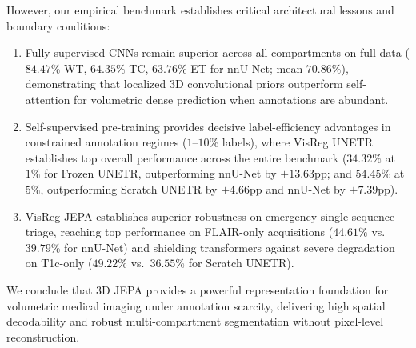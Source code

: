 \documentclass{article}
\begin{document}
However, our empirical benchmark establishes critical architectural lessons and boundary conditions:
\begin{enumerate}
    \item Fully supervised CNNs remain superior across all compartments on full data ($84.47\%$ WT, $64.35\%$ TC, $63.76\%$ ET for nnU-Net; mean $70.86\%$), demonstrating that localized 3D convolutional priors outperform self-attention for volumetric dense prediction when annotations are abundant.
    \item Self-supervised pre-training provides decisive label-efficiency advantages in constrained annotation regimes ($1\text{--}10\%$ labels), where VisReg UNETR establishes top overall performance across the entire benchmark ($34.32\%$ at $1\%$ for Frozen UNETR, outperforming nnU-Net by $+13.63\text{pp}$; and $54.45\%$ at $5\%$, outperforming Scratch UNETR by $+4.66\text{pp}$ and nnU-Net by $+7.39\text{pp}$).
    \item VisReg JEPA establishes superior robustness on emergency single-sequence triage, reaching top performance on FLAIR-only acquisitions ($44.61\%$ vs.\ $39.79\%$ for nnU-Net) and shielding transformers against severe degradation on T1c-only ($49.22\%$ vs.\ $36.55\%$ for Scratch UNETR).
\end{enumerate}
We conclude that 3D JEPA provides a powerful representation foundation for volumetric medical imaging under annotation scarcity, delivering high spatial decodability and robust multi-compartment segmentation without pixel-level reconstruction.



\end{document}
